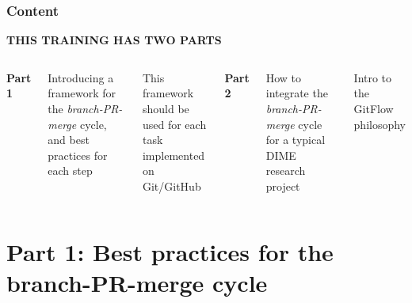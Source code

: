\documentclass[aspectratio=169]{beamer} %
\begin{document}
\begin{frame}
	\frametitle{Content}

	\Large\centering \textbf{THIS TRAINING HAS TWO PARTS}

	\vspace{.8em}

	\begin{columns}[T]



		\centering
		\large \textbf{Part 1}

		\vspace{1em}

		\raggedright
		\normalfont Introducing a framework for the \textit{branch-PR-merge} cycle,
		and best practices for each step

		\vspace{.5em}

		\normalfont This framework should be used for
		each task implemented on Git/GitHub



		\centering
		\large \textbf{Part 2}

		\vspace{1em}

		\raggedright
		\normalfont How to integrate the \textit{branch-PR-merge} cycle for a typical DIME research project

		\vspace{.5em}

		\normalfont Intro to the GitFlow philosophy


	\end{columns}

	\end{frame}



\section{Part 1: \newline Best practices for the branch-PR-merge cycle}
\end{document}
